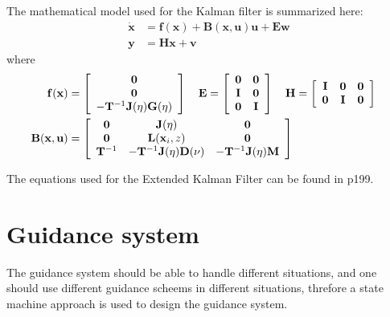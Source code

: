 	The mathematical model used for the Kalman filter is summarized here:
		\begin{align}
			\mathbf{\dot{x}} &= \mathbf{f(x)} + \mathbf{B(x, u) u} + \mathbf{E w} \\
			\mathbf{y} &= \mathbf{H x} + \mathbf{v}
		\end{align}
	where
		\begin{align}
			\mathbf{f(x)} &= \left[ \begin{array}{c}
						\mathbf{0}\\
						\mathbf{0}\\
						-\mathbf{T}^{-1} \mathbf{J}(\mathbf{\eta}) \mathbf{G}(\mathbf{\eta})
						\end{array} \right] \quad 
			\mathbf{E} = \left[ \begin{array}{cc}
			                      	\mathbf{0} & \mathbf{0} \\
			                      	\mathbf{I} & \mathbf{0}\\
			                      	\mathbf{0} & \mathbf{I}
			                     \end{array} \right] \quad
			\mathbf{H} = \left[ \begin{array}{ccc}
			                      	\mathbf{I} & \mathbf{0} & \mathbf{0}\\
			                      	\mathbf{0} & \mathbf{I} & \mathbf{0}
			                     \end{array} \right] \\
			\mathbf{B(x, u)} &= \left[ \begin{array}{ccc}
			                      	\mathbf{0} & \mathbf{J}(\mathbf{\eta}) & \mathbf{0}\\
			                      	\mathbf{0} & \mathbf{L}(\mathbf{x}_i, z) & \mathbf{0}\\
			                      	\mathbf{T}^{-1} & -\mathbf{T}^{-1}\mathbf{J}(\mathbf{\eta}) \mathbf{D(\nu)} & -\mathbf{T}^{-1} \mathbf{J}(\mathbf{\eta}) \mathbf{M}
			                     \end{array} \right] &
		\end{align}

	The equations used for the Extended Kalman Filter can be found in \cite{fossen} p199.
	
	
	

\section{Guidance system}
	The guidance system should be able to handle different situations, and one should use different guidance scheems in different situations, threfore a state machine approach is used to design the guidance system.
	
